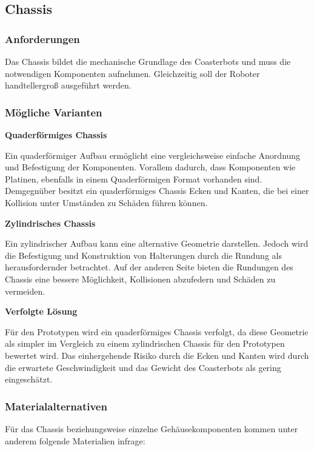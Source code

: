 \documentclass[
  a4paper,
  12pt,
  DIV=12,        %
  parskip=half,  %
  headings=small %
]{scrartcl}
\theoremstyle{definition}
\theoremstyle{definition}
\begin{document}
\subsection{Chassis}\label{chassis}

\subsubsection{Anforderungen}\label{anforderungen}

Das Chassis bildet die mechanische Grundlage des Coasterbots und muss
die notwendigen Komponenten aufnehmen. Gleichzeitig soll der Roboter
handtellergroß ausgeführt werden.

\subsubsection{Mögliche Varianten}\label{muxf6gliche-varianten}

\textbf{Quaderförmiges Chassis}

Ein quaderförmiger Aufbau ermöglicht eine vergleichsweise einfache
Anordnung und Befestigung der Komponenten. Vorallem dadurch, dass Komponenten 
wie Platinen, ebenfalls in einem Quaderförmigen Format vorhanden sind.
Demgegnüber besitzt ein quaderförmiges Chassis Ecken und Kanten, die
bei einer Kollision unter Umständen zu Schäden führen können.

\textbf{Zylindrisches Chassis}

Ein zylindrischer Aufbau kann eine alternative Geometrie darstellen. Jedoch 
wird die Befestigung und Konstruktion von Halterungen durch die Rundung als
herausfordernder betrachtet. Auf der anderen Seite bieten die Rundungen des Chassis 
eine bessere Möglichkeit, Kollisionen abzufedern und Schäden zu vermeiden.

\textbf{Verfolgte Lösung}

Für den Prototypen wird ein quaderförmiges Chassis verfolgt, da diese Geometrie
als simpler im Vergleich zu einem zylindrischen Chassis für den Prototypen bewertet wird.
Das einhergehende Risiko durch die Ecken und Kanten wird durch die erwartete Geschwindigkeit 
und das Gewicht des Coasterbots als gering eingeschätzt. 

\subsubsection{Materialalternativen}\label{materialalternativen}

Für das Chassis beziehungsweise einzelne Gehäusekomponenten kommen unter
anderem folgende Materialien infrage:
\end{document}
